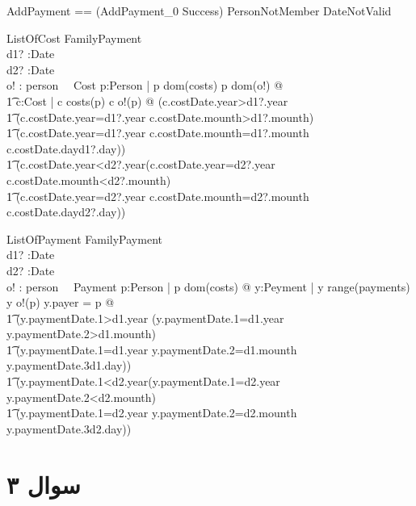 \documentclass{article}
\begin{document}
\begin{zed}
AddPayment == (AddPayment_0 \land Success) \lor PersonNotMember \lor DateNotValid
\end{zed}

\begin{schema}{ListOfCost}
\Xi FamilyPayment\\
d1? :Date\\
d2? :Date\\
o! : person \fun \power~~Cost
\where
\forall p:Person  | p \in dom(costs) \land p \in dom(o!) @ \\
\t1 \forall c:Cost | c \in costs(p) \land c \in o!(p) @ (c.costDate.year>d1?.year \lor\\
\t1 (c.costDate.year=d1?.year \land c.costDate.mounth>d1?.mounth) \lor\\
\t1 (c.costDate.year=d1?.year \land c.costDate.mounth=d1?.mounth \land c.costDate.day\ge d1?.day))\land\\
\t1 (c.costDate.year<d2?.year\lor (c.costDate.year=d2?.year \land c.costDate.mounth<d2?.mounth) \lor\\
\t1 (c.costDate.year=d2?.year \land c.costDate.mounth=d2?.mounth \land c.costDate.day\le d2?.day))

\end{schema}

\begin{schema}{ListOfPayment}
\Xi FamilyPayment\\
d1? :Date\\
d2? :Date\\
o! : person \fun \power~~Payment
\where
\forall p:Person | p \in dom(costs) @ \forall y:Peyment | y \in range(payments) \land y \in o!(p) \land y.payer = p @\\
\t1 (y.paymentDate.1>d1.year \lor (y.paymentDate.1=d1.year \land y.paymentDate.2>d1.mounth) \lor\\
\t1 (y.paymentDate.1=d1.year \land y.paymentDate.2=d1.mounth \land y.paymentDate.3\ge d1.day))\land\\
\t1 (y.paymentDate.1<d2.year\lor (y.paymentDate.1=d2.year \land y.paymentDate.2<d2.mounth) \lor\\
\t1 (y.paymentDate.1=d2.year \land y.paymentDate.2=d2.mounth \land y.paymentDate.3\le d2.day))

\end{schema}

\section*{سوال ۳}
\end{document}
